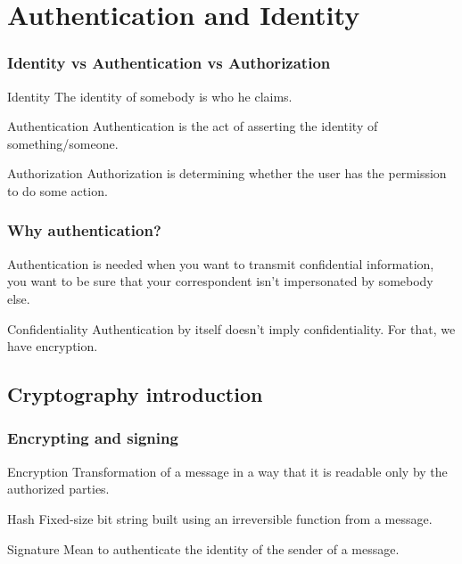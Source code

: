\section{Authentication and Identity}

\begin{frame}
\sectionpage
\end{frame}

\begin{frame}
\frametitle{Identity vs Authentication vs Authorization}
\begin{block}{Identity}
The identity of somebody is who he claims.
\end{block}
\begin{block}{Authentication}
Authentication is the act of asserting the identity of something/someone.
\end{block}
\begin{block}{Authorization}
Authorization is determining whether the user has the permission to do some
action.
\end{block}
\end{frame}

\begin{frame}
\frametitle{Why authentication?}
Authentication is needed when you want to transmit confidential
information, you want to be sure that your correspondent isn't
impersonated by somebody else.
\begin{block}{Confidentiality}
Authentication by itself doesn't imply confidentiality.
For that, we have encryption.
\end{block}
\end{frame}

\subsection{Cryptography introduction}

\begin{frame}
\frametitle{Encrypting and signing}
\begin{block}{Encryption}
Transformation of a message in a way that it is readable only by the
authorized parties.
\end{block}
\begin{block}{Hash}
Fixed-size bit string built using an irreversible function from a message.
\end{block}
\begin{block}{Signature}
Mean to authenticate the identity of the sender of a message.
\end{block}
\end{frame}

